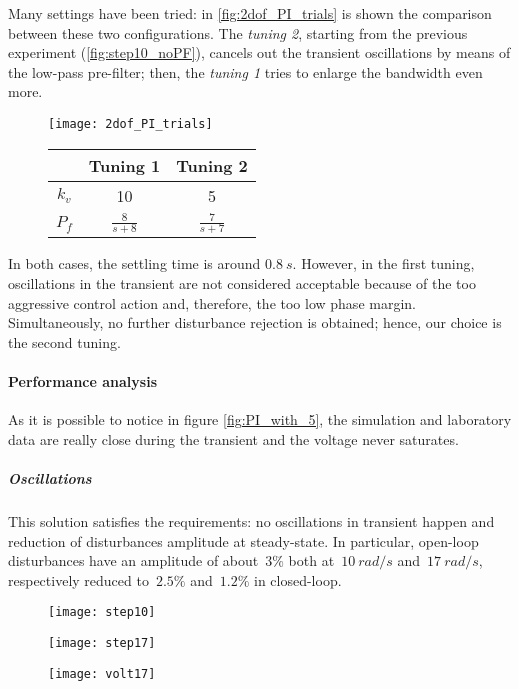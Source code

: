 Many settings have been tried: in \cref{fig:2dof_PI_trials} is shown the comparison between these two configurations. The \textit{tuning 2}, starting from the previous experiment (\cref{fig:step10_noPF}), cancels out the transient oscillations by means of the low-pass pre-filter; then, the \textit{tuning 1} tries to enlarge the bandwidth even more.
\begin{figure*}[h]
	\centering
	\begin{subfigure}{0.45\columnwidth}
		\centering
		\texttt{[image: 2dof\_PI\_trials]}
	\end{subfigure}
	\begin{subfigure}{0.45\columnwidth}
		\centering
		\begin{tabular}{|c|cc|}
			\hline
			& Tuning 1 & Tuning 2 \\
			\hline
			$k_v$ & 10 & 5 \\
			$P_f$ & $\frac{8}{s+8}$ & $\frac{7}{s+7}$ \\
			\hline
		\end{tabular}
	\end{subfigure}
	\caption{Comparison between two different tunings}
	\label{fig:2dof_PI_trials}
\end{figure*}
In both cases, the settling time is around $0.8\ s$. However, in the first tuning, oscillations in the transient are not considered acceptable because of the too aggressive control action and, therefore, the too low phase margin. Simultaneously, no further disturbance rejection is obtained; hence, our choice is the second tuning.

\paragraph{Performance analysis}
As it is possible to notice in figure \ref{fig:PI_with_5}, the simulation and laboratory data are really close during the transient and the voltage never saturates.
\subparagraph{Oscillations} This solution satisfies the requirements: no oscillations in transient happen and reduction of disturbances amplitude at steady-state. In particular, open-loop disturbances have an amplitude of about~$3\%$ both at~$10\ rad/s$ and~$17\ rad/s$, respectively reduced to~$2.5\%$ and~$1.2\%$ in closed-loop.
\begin{figure*}[h]
	\centering
	\begin{subfigure}{0.4\columnwidth}
		\texttt{[image: step10]}
	\end{subfigure}
	\begin{subfigure}{0.4\columnwidth}
		\texttt{[image: step17]}
	\end{subfigure}
	\begin{subfigure}{0.4\columnwidth}
		\texttt{[image: volt17]}
	\end{subfigure}
	\caption{Speed control loop with $k_v=5$ with low-pass pre-filter}
	\label{fig:PI_with_5}
\end{figure*}

